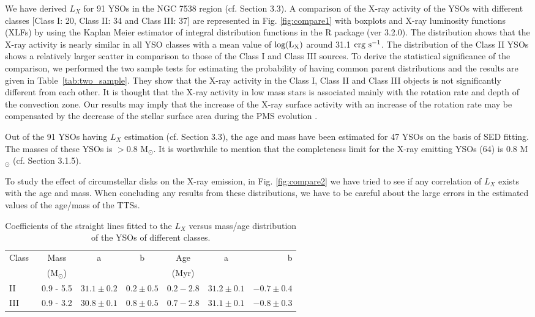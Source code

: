 \documentclass[a4paper,fleqn,usenatbib,useAMS]{mnras}
\begin{document}
We have derived $L_X$ for 91 YSOs in the NGC 7538 region (cf. Section 3.3).
A comparison of the X-ray activity of the YSOs with different classes 
[Class I: 20, Class II: 34 and Class III: 37]
are represented in Fig. \ref{fig:compare1}  with boxplots and  X-ray luminosity functions (XLFs) by using the Kaplan Meier estimator
of integral distribution functions in  the R package (ver 3.2.0). 
The distribution shows that the X-ray activity is nearly similar in all YSO classes 
with a mean value of $\rm{log (L_X)}$ around 31.1 $\rm{erg~s^{-1}}$.
The distribution of  the Class II YSOs shows a relatively larger scatter in
comparison to those of  the Class I and Class III sources.
To derive the statistical significance of the comparison,
we performed the two sample tests for estimating the probability of having  common parent distributions
and the results are given in Table~\ref{tab:two_sample}.
They 
show that the X-ray activity in  the Class I, Class II and Class III objects is not significantly different from each other.
It is thought that the X-ray activity in low mass stars is associated mainly with the rotation rate and depth of the convection zone.
Our results may imply that the increase of the X-ray surface activity with an increase of the 
rotation rate may be compensated by the decrease of the stellar surface 
area during  the PMS evolution \citep{1997A&A...324..690P, bha+13}.

Out of  the 91 YSOs having  $L_X$ estimation (cf. Section 3.3), the age and mass have been
estimated for 47 YSOs on the basis of SED fitting. The masses of these YSOs is $>$0.8 M$_\odot$.
It is worthwhile to mention that the completeness limit for the X-ray emitting YSOs (64) is 0.8 M$_\odot$ (cf. Section 3.1.5).

To study the effect of  circumstellar disks on the X-ray emission,
in Fig. \ref{fig:compare2} we have tried to see  if any correlation of $L_X$ exists with the age and mass. 
When concluding any results from these distributions, we have to be careful about the large errors in the 
estimated values of the age/mass of the TTSs.


\begin{table}
\scriptsize
\caption{\label{coefficients}  Coefficients of the straight lines fitted to the $L_X$ versus mass/age distribution of  the YSOs of different classes.}
\begin{tabular}{@{}lcccccr@{}}
\hline
Class~&Mass   & a    &  b  &  Age  & a & b \\
&(M$_\odot$)  &      &     &  (Myr) &   &   \\
\hline
II &0.9 -  5.5  &$  31.1\pm 0.2$&$ 0.2\pm 0.5$&$ 0.2 - 2.8   $&$   31.2\pm 0.1$&$ -0.7\pm 0.4$\\
III &0.9 -  3.2  &$  30.8\pm 0.1$&$ 0.8\pm 0.5$&$ 0.7 - 2.8   $&$   31.1\pm 0.1$&$ -0.8\pm 0.3$\\
\hline
\end{tabular}
\end{table}
\end{document}
